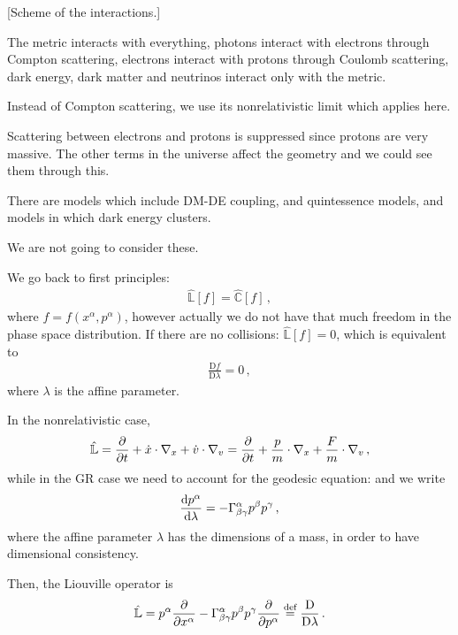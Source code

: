 \documentclass[main.tex]{subfiles}
\begin{document}
[Scheme of the interactions.]

The metric interacts with everything, photons interact with electrons through Compton scattering, electrons interact with protons through Coulomb scattering, dark energy, dark matter and neutrinos  interact only with the metric.

Instead of Compton scattering, we use its nonrelativistic limit which applies here. 

Scattering between electrons and protons is suppressed since protons are very massive. The other terms in the universe affect the geometry and we could see them through this. 

There are models which include DM-DE coupling, and quintessence models, 
and models in which dark energy clusters. 

We are not going to consider these. 

We go back to first principles: 
%
\begin{align}
\hat{\mathbb{L}} [f] = \hat{\mathbb{C}} [f]
\,,
\end{align}
%
where \(f = f(x^{\alpha }, p^{\alpha })\), however actually we do not have that much freedom in the phase space distribution. 
If there are no collisions: \(\hat{\mathbb{L}} [f] =0 \), which is equivalent to 
%
\begin{align}
\frac{\mathrm{D}f}{\mathrm{D}\lambda } =0
\,,
\end{align}
%
where \(\lambda \) is the affine parameter. 

In the nonrelativistic case, 
%
\begin{align}
\hat{\mathbb{L}} = \pdv{}{t} + \dot{x} \cdot \nabla_{x} + \dot{v} \cdot \nabla_{v} = \pdv{}{t} + \frac{p}{m} \cdot \nabla_{x} + \frac{F}{m} \cdot \nabla_{v} 
\,,
\end{align}
%
while in the GR case we need to account for the geodesic equation: and we write 
%
\begin{align}
\dv{p^{\alpha }}{\lambda } = - \Gamma^{\alpha }_{\beta \gamma } p^{\beta } p^{\gamma }
\,,
\end{align}
%
where the affine parameter \(\lambda \) has the dimensions of a mass, in order to have dimensional consistency.

Then, the Liouville operator is 
%
\begin{align}
\hat{\mathbb{L}} = p^{\alpha } \pdv{}{x^{\alpha }}-  
\Gamma^{\alpha }_{\beta \gamma } p^{\beta } p^{\gamma } \pdv{}{p^{\alpha }} \overset{\text{def}}{=} \frac{\mathrm{D}}{\mathrm{D}\lambda }
\,.
\end{align}
\end{document}
